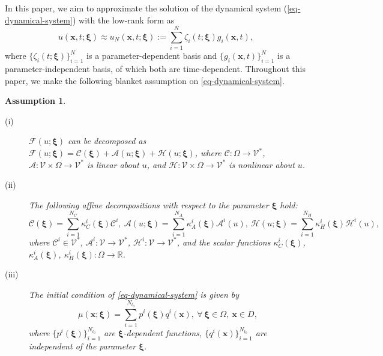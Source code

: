 \documentclass[10pt,a4paper]{article}
\newtheorem{assumption}{Assumption}
\numberwithin{equation}{section}
\numberwithin{lemma}{section}
\numberwithin{example}{section}
\numberwithin{definition}{section}
\numberwithin{assumption}{section}
\numberwithin{theorem}{section}
\numberwithin{proposition}{section}
\numberwithin{corollary}{section}
\numberwithin{remark}{section}
\begin{document}
In this paper, we aim to approximate the solution of the dynamical system (\ref{eq-dynamical-system}) with the low-rank form as
\begin{equation}
\label{eq-approx}
u(\bm{x},t;\bm{\xi})\approx u_N(\bm{x},t;\bm{\xi}):=\sum_{i=1}^{N}\zeta_i(t;\bm{\xi})g_i(\bm{x},t),
\end{equation}
where $\{\zeta_i(t;\bm{\xi}) \}_{i=1}^{N}$ is a parameter-dependent basis and $\{ g_i(\bm{x},t)\}_{i=1}^{N}$ is a parameter-independent basis, of which both are time-dependent.
Throughout this paper, we make the following blanket assumption on \eqref{eq-dynamical-system}. 
\begin{assumption}
\label{assall} 
\begin{description}
\item[(i)]
$\mathcal{F}(u;\bm{\xi})$ can be decomposed as 
$\mathcal{F}(u;\bm{\xi})=\mathcal{C}(\bm{\xi})+\mathcal{A}(u;\bm{\xi})+\mathcal{H}(u;\bm{\xi})$, 
where $\mathcal{C}:\Omega\to\mathcal{V}^*$, $\mathcal{A}:\mathcal{V}\times \Omega\to\mathcal{V}^*$ is linear about $u$, and 
$\mathcal{H}:\mathcal{V}\times \Omega\to\mathcal{V}^*$ 
is nonlinear about $u$.

\item[(ii)]
The following affine decompositions with respect to the parameter $\bm{\xi}$ hold: 
\begin{equation}
\label{eq-affine-f}
\mathcal{C}(\bm{\xi})=\sum_{i=1}^{N_C}\kappa_C^i(\bm{\xi})\mathcal{C}^i, ~
\mathcal{A}(u;\bm{\xi})=\sum_{i=1}^{N_A}\kappa_A^i(\bm{\xi})\mathcal{A}^i(u),~  
\mathcal{H}(u;\bm{\xi}) =\sum_{i=1}^{N_H}\kappa_H^i(\bm{\xi})\mathcal{H}^i(u), 
\end{equation}
where $\mathcal{C}^i\in\mathcal{V}^*$, $\mathcal{A}^i:\mathcal{V}\to\mathcal{V}^*$, $\mathcal{H}^i:\mathcal{V}\to\mathcal{V}^*$, and the scalar functions $\kappa_C^i(\bm{\xi})$, $\kappa_A^i(\bm{\xi})$, $\kappa_H^i(\bm{\xi}):\Omega\to \mathbb{R}$.


\item[(iii)]
The initial condition of \eqref{eq-dynamical-system} is given by
\begin{equation}
\label{eq-u0-affine}
{\mu(\bm{x};\bm{\xi})}=\sum_{i=1}^{N_{t_0}}p^i(\bm{\xi})q^i(\bm{x}),\ \forall ~\bm{\xi}\in\Omega,~\bm{x} \in D,
\end{equation}
where $\{p^i(\bm{\xi})\}_{i=1}^{N_{t_0}}$ are $\bm{\xi}$-dependent functions, $\{q^i(\bm{x})\}_{i=1}^{N_{t_0}}$ are independent of the parameter $\bm{\xi}$. 
\end{description}
\end{assumption}
\end{document}
